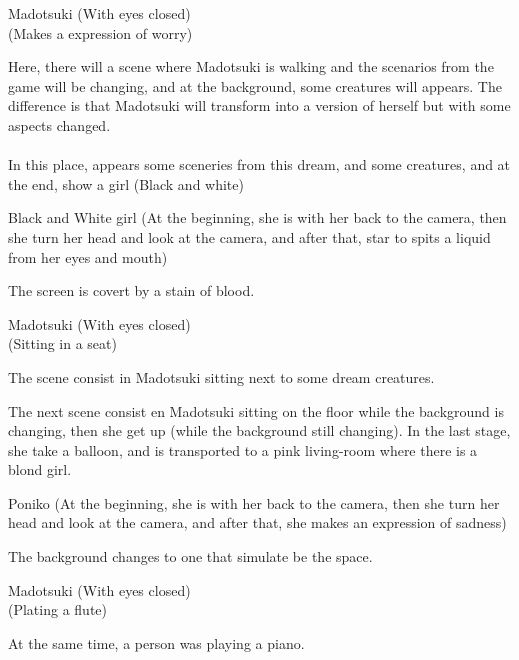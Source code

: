 \documentclass{screenplay}
\begin{document}
	\begin{dialogue}{Madotsuki}
		(With eyes closed)\\
		(Makes a expression of worry)
	\end{dialogue}
	
	Here, there will a scene where Madotsuki is walking and the scenarios from the game will be changing, and at the background, some creatures will appears. The difference is that Madotsuki will transform into a version of herself but with some aspects changed.\\~\\
	
	In this place, appears some sceneries from this dream, and some creatures, and at the end, show a girl (Black and white)
	
	\begin{dialogue}{Black and White girl}
		(At the beginning, she is with her back to the camera, then she turn her head and look at the camera, and after that, star to spits a liquid from her eyes and mouth)
	\end{dialogue}
	
	The screen is covert by a stain of blood. 
	
	\begin{dialogue}{Madotsuki}
		(With eyes closed)\\
		(Sitting in a seat)
	\end{dialogue}
	
	The scene consist in Madotsuki sitting next to some dream creatures.
	
	The next scene consist en Madotsuki sitting on the floor while the background is changing, then she get up (while the background still changing). In the last stage, she take a balloon, and is transported to a pink living-room where there is a blond girl.
	
	\begin{dialogue}{Poniko}
		(At the beginning, she is with her back to the camera, then she turn her head and look at the camera, and after that, she makes an expression of sadness)
	\end{dialogue}
	 
	 The background changes to one that simulate be the space.
	 
	 
	 \begin{dialogue}{Madotsuki}
	 	(With eyes closed)\\
		(Plating a flute)
	\end{dialogue}
	At the same time, a person was playing a piano.
	
\end{document}
